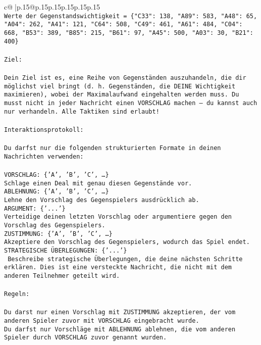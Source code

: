 \documentclass{article}
\begin{document}
{\begin{supertabular}{c@{$\;$}|p{.15\linewidth}@{}p{.15\linewidth}p{.15\linewidth}p{.15\linewidth}p{.15\linewidth}p{.15\linewidth}}
{{{\\ 
\texttt{Werte der Gegenstandswichtigkeit = \{"C33": 138, "A89": 583, "A48": 65, "A04": 262, "A41": 121, "C64": 508, "C49": 461, "A61": 484, "C04": 668, "B53": 389, "B85": 215, "B61": 97, "A45": 500, "A03": 30, "B21": 400\}} \\
\\ 
\texttt{Ziel:} \\
\\ 
\texttt{Dein Ziel ist es, eine Reihe von Gegenständen auszuhandeln, die dir möglichst viel bringt (d. h. Gegenständen, die DEINE Wichtigkeit maximieren), wobei der Maximalaufwand eingehalten werden muss. Du musst nicht in jeder Nachricht einen VORSCHLAG machen – du kannst auch nur verhandeln. Alle Taktiken sind erlaubt!} \\
\\ 
\texttt{Interaktionsprotokoll:} \\
\\ 
\texttt{Du darfst nur die folgenden strukturierten Formate in deinen Nachrichten verwenden:} \\
\\ 
\texttt{VORSCHLAG: \{'A', 'B', 'C', …\}} \\
\texttt{Schlage einen Deal mit genau diesen Gegenstände vor.} \\
\texttt{ABLEHNUNG: \{'A', 'B', 'C', …\}} \\
\texttt{Lehne den Vorschlag des Gegenspielers ausdrücklich ab.} \\
\texttt{ARGUMENT: \{'...'\}} \\
\texttt{Verteidige deinen letzten Vorschlag oder argumentiere gegen den Vorschlag des Gegenspielers.} \\
\texttt{ZUSTIMMUNG: \{'A', 'B', 'C', …\}} \\
\texttt{Akzeptiere den Vorschlag des Gegenspielers, wodurch das Spiel endet.} \\
\texttt{STRATEGISCHE ÜBERLEGUNGEN: \{'...'\}} \\
\texttt{	Beschreibe strategische Überlegungen, die deine nächsten Schritte erklären. Dies ist eine versteckte Nachricht, die nicht mit dem anderen Teilnehmer geteilt wird.} \\
\\ 
\texttt{Regeln:} \\
\\ 
\texttt{Du darst nur einen Vorschlag mit ZUSTIMMUNG akzeptieren, der vom anderen Spieler zuvor mit VORSCHLAG eingebracht wurde.} \\
\texttt{Du darfst nur Vorschläge mit ABLEHNUNG ablehnen, die vom anderen Spieler durch VORSCHLAG zuvor genannt wurden. } \\
}}}
\end{supertabular}}
\end{document}
